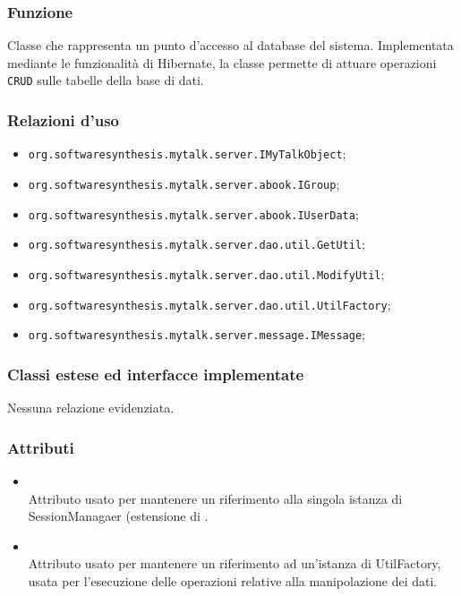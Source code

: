 
\subsubsection*{Funzione}
Classe che rappresenta un punto d'accesso al database del sistema. Implementata mediante le funzionalità di Hibernate, la classe permette di attuare operazioni \texttt{CRUD} sulle tabelle della base di dati.

\subsubsection*{Relazioni d'uso}

\begin{itemize}
	\item \texttt{org.softwaresynthesis.mytalk.server.IMyTalkObject};
	\item \texttt{org.softwaresynthesis.mytalk.server.abook.IGroup};
	\item \texttt{org.softwaresynthesis.mytalk.server.abook.IUserData};
	\item \texttt{org.softwaresynthesis.mytalk.server.dao.util.GetUtil};
	\item \texttt{org.softwaresynthesis.mytalk.server.dao.util.ModifyUtil};
	\item \texttt{org.softwaresynthesis.mytalk.server.dao.util.UtilFactory};
	\item \texttt{org.softwaresynthesis.mytalk.server.message.IMessage};
\end{itemize}

\subsubsection*{Classi estese ed interfacce implementate}

Nessuna relazione evidenziata.

\subsubsection*{Attributi}

\begin{itemize}
	\item{}\\
	Attributo usato per mantenere un riferimento alla singola istanza di SessionManagaer (estensione di .
	\item{}\\
	Attributo usato per mantenere un riferimento ad un'istanza di UtilFactory, usata per l'esecuzione delle operazioni relative alla manipolazione dei dati.
\end{itemize}

